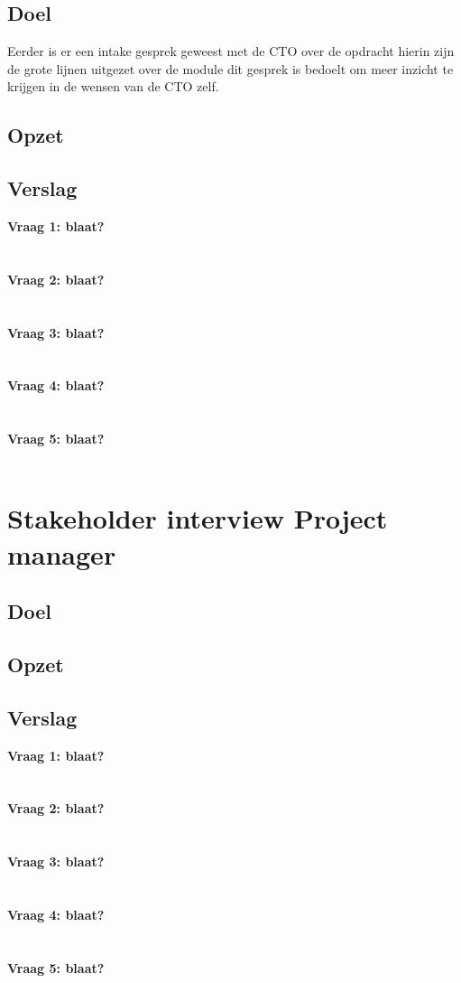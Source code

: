 \subsection{Doel}
Eerder is er een intake gesprek geweest met de CTO over de opdracht hierin zijn de grote lijnen uitgezet over de module dit gesprek is bedoelt om meer inzicht te krijgen in de wensen van de CTO zelf.
\subsection{Opzet}

\subsection{Verslag}
\textbf{Vraag 1: blaat?}\\
\lipsum[01]\\
\\
\textbf{Vraag 2: blaat?}\\
\lipsum[02]\\
\\
\textbf{Vraag 3: blaat?}\\
\lipsum[03]\\
\\
\textbf{Vraag 4: blaat?}\\
\lipsum[04]\\
\\
\textbf{Vraag 5: blaat?}\\
\lipsum[05]\\

\section{Stakeholder interview Project manager}
\subsection{Doel}
\subsection{Opzet}
\subsection{Verslag}
\textbf{Vraag 1: blaat?}\\
\lipsum[01]\\
\\
\textbf{Vraag 2: blaat?}\\
\lipsum[02]\\
\\
\textbf{Vraag 3: blaat?}\\
\lipsum[03]\\
\\
\textbf{Vraag 4: blaat?}\\
\lipsum[04]\\
\\
\textbf{Vraag 5: blaat?}\\
\lipsum[05]\\

